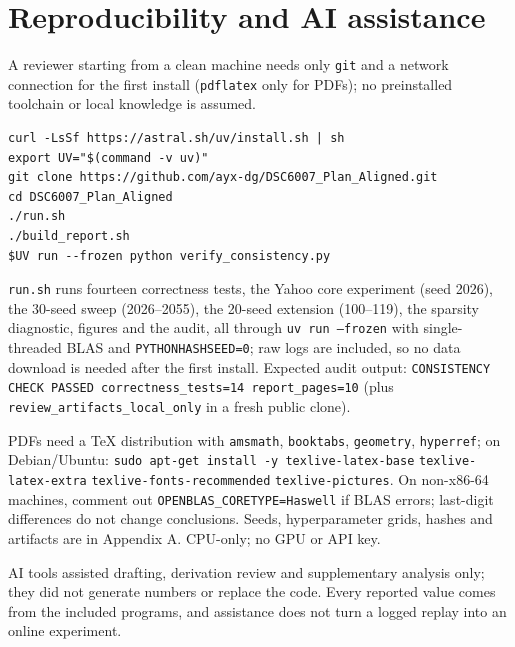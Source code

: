 \documentclass[10pt,a4paper]{article}
\begin{document}
\section*{Reproducibility and AI assistance}
A reviewer starting from a clean machine needs only \texttt{git} and a
network connection for the first install (\texttt{pdflatex} only for PDFs);
no preinstalled toolchain or local knowledge is assumed.

\begin{verbatim}
curl -LsSf https://astral.sh/uv/install.sh | sh
export UV="$(command -v uv)"
git clone https://github.com/ayx-dg/DSC6007_Plan_Aligned.git
cd DSC6007_Plan_Aligned
./run.sh
./build_report.sh
$UV run --frozen python verify_consistency.py
\end{verbatim}

\noindent \texttt{run.sh} runs fourteen correctness tests, the Yahoo core
experiment (seed 2026), the 30-seed sweep (2026--2055), the 20-seed extension
(100--119), the sparsity diagnostic, figures and the audit, all through
\texttt{uv run --frozen} with single-threaded BLAS and
\texttt{PYTHONHASHSEED=0}; raw logs are included, so no data download is
needed after the first install. Expected audit output:
\texttt{CONSISTENCY CHECK PASSED correctness\_tests=14 report\_pages=10}
(plus \texttt{review\_artifacts\_local\_only} in a fresh public clone).

\begin{sloppypar}
\noindent PDFs need a TeX distribution with \texttt{amsmath},
\texttt{booktabs}, \texttt{geometry}, \texttt{hyperref}; on Debian/Ubuntu:
\texttt{sudo apt-get install -y texlive-latex-base}
\texttt{texlive-latex-extra} \texttt{texlive-fonts-recommended}
\texttt{texlive-pictures}. On non-x86-64 machines, comment out
\texttt{OPENBLAS\_CORETYPE=Haswell} if BLAS errors; last-digit differences
do not change conclusions. Seeds, hyperparameter grids, hashes and artifacts
are in Appendix A. CPU-only; no GPU or API key.\par
\end{sloppypar}

\noindent AI tools assisted drafting, derivation review and supplementary
analysis only; they did not generate numbers or replace the code. Every
reported value comes from the included programs, and assistance does not turn
a logged replay into an online experiment.
\end{document}
